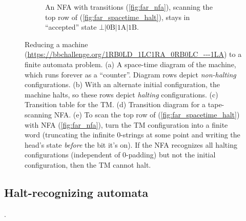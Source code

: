 \begin{figure}
\begin{subfigure}{\textwidth}
    \caption{An NFA with transitions (\ref{fig:far_nfa}), scanning the top row of (\ref{fig:far_spacetime_halt}), stays in ``accepted'' state
      $\bot|\textrm{0B}|\textrm{1A}|\textrm{1B}$.}
    \label{fig:far_scan}
  \end{subfigure}

  \caption{Reducing a machine (\url{https://bbchallenge.org/1RB0LD_1LC1RA_0RB0LC_---1LA}) to a finite automata problem.
    (a) A space-time diagram of the machine, which runs forever as a ``counter''. Diagram rows depict \emph{non-halting} configurations.
    (b) With an alternate initial configuration, the machine halts, so these rows depict \emph{halting} configurations.
    (c) Transition table for the TM.
    (d) Transition diagram for a tape-scanning NFA.
    (e) To scan the top row of (\ref{fig:far_spacetime_halt}) with NFA (\ref{fig:far_nfa}), turn the TM configuration into a finite word
        (truncating the infinite 0-strings at some point and writing the head's state \emph{before} the bit it's on).
        If the NFA recognizes all halting configurations (independent of 0-padding) but not the initial configuration, then the TM cannot halt.}
  \label{fig:finite-automata-reduction}
\end{figure}


\subsection{Halt-recognizing automata}
\label{far-defs-recognizer}
.

